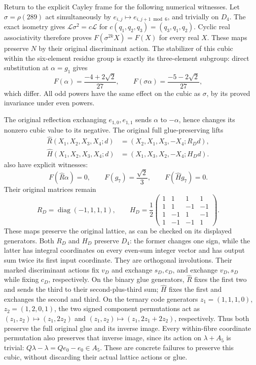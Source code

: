 Return to the explicit Cayley frame for the following numerical
witnesses. Let \(\sigma=\rho(289)\) act simultaneously by
\(e_{i,j}\mapsto e_{i,j+1\bmod6}\), and trivially on \(D_4\).
The exact isometry gives
\(\mathcal L\sigma^2=c\mathcal L\) for
\(c(q_1,q_2,q_3)=(q_3,q_1,q_2)\). Cyclic real associativity
therefore proves \(F(\sigma^{2k}X)=F(X)\) for every real \(X\).
These maps preserve \(N\) by their original discriminant action.
The stabilizer of this cubic within the six-element residue group
is exactly its three-element subgroup: direct substitution at
\(\alpha=g_1\) gives
\begin{equation}
 F(\alpha)=\frac{-4+2\sqrt2}{27},\qquad
 F(\sigma\alpha)=\frac{-5-2\sqrt2}{27},
 \label{nca:eq:residue-nonpreserver}
\end{equation}
which differ. All odd powers have the same effect on the cubic
as \(\sigma\), by its proved invariance under even powers.

The original reflection exchanging \(e_{1,0},e_{1,1}\) sends
\(\alpha\) to \(-\alpha\), hence changes its nonzero cubic
value to its negative. The original full glue-preserving lifts
\[
 \begin{aligned}
 \widehat R(X_1,X_2,X_3,X_4;d)
       &=(X_2,X_1,X_3,-X_4;R_Dd),\\
 \widehat H(X_1,X_2,X_3,X_4;d)
       &=(X_1,X_3,X_2,-X_4;H_Dd).
 \end{aligned}
\]
also have explicit witnesses:
\[
 F(\widehat R\alpha)=0,\qquad
 F(g_7)=\frac{\sqrt2}{3},\qquad F(\widehat Hg_7)=0.
\]
Their original matrices remain
\[
 R_D=\operatorname{diag}(-1,1,1,1),\qquad
 H_D=\frac12\begin{pmatrix}1&1&1&1\\1&1&-1&-1\\
                           1&-1&1&-1\\1&-1&-1&1\end{pmatrix}.
\]
These maps preserve the original lattice, as can be checked on its
displayed generators.  Both \(R_D\) and \(H_D\) preserve \(D_4\):
the former changes one sign, while the latter has integral coordinates
on every even-sum integer vector and has output sum twice its first
input coordinate. They are orthogonal involutions. Their marked
discriminant actions fix \(v_D\) and exchange \(s_D,c_D\), and
exchange \(v_D,s_D\) while fixing \(c_D\), respectively.
On the binary glue generators, \(\widehat R\) fixes the first
two and sends the third to their second-plus-third sum;
\(\widehat H\) fixes the first and exchanges the second and third.
On the ternary code generators \(z_1=(1,1,1,0)\),
\(z_2=(1,2,0,1)\), the two signed component permutations act as
\((z_1,z_2)\mapsto(z_1,2z_2)\) and
\((z_1,z_2)\mapsto(z_1,2z_1+2z_2)\), respectively.
Thus both preserve the full original glue and its inverse image.
Every within-fibre coordinate permutation also preserves that inverse
image, since its action on \(\lambda+A_5\) is trivial:
\(Q\lambda-\lambda=Qe_0-e_0\in A_5\).
These are concrete failures to preserve this cubic, without
discarding their actual lattice actions or glue.

